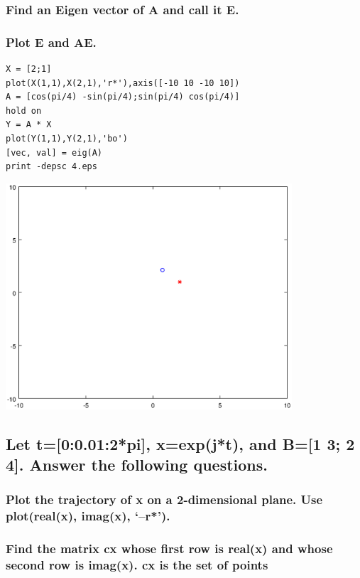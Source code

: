 \documentclass[12pt,a4paper]{article}
\begin{document}
\subsubsection{Find an Eigen vector of A and call it E. } 
\subsubsection{Plot E and AE.} 
\begin{lstlisting}
X = [2;1]
plot(X(1,1),X(2,1),'r*'),axis([-10 10 -10 10])
A = [cos(pi/4) -sin(pi/4);sin(pi/4) cos(pi/4)]
hold on
Y = A * X
plot(Y(1,1),Y(2,1),'bo')
[vec, val] = eig(A)
print -depsc 4.eps
\end{lstlisting}

\includegraphics[width=0.8\textwidth]{4.eps}
\subsection{Let t=[0:0.01:2*pi], x=exp(j*t), and B=[1 3; 2 4].  Answer the following questions.}  

\subsubsection{Plot the trajectory of x on a 2-dimensional plane.  Use plot(real(x),  imag(x), ‘--r*’).} 

\subsubsection{Find the matrix cx whose first row is real(x) and whose second row is imag(x). cx is the set of points } 
\end{document}
